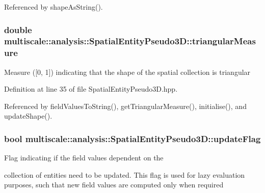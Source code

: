 Referenced by shape\-As\-String().

\hypertarget{classmultiscale_1_1analysis_1_1SpatialEntityPseudo3D_a7e8a7c888b5ab5a204f6d4ffa283709c}{
\subsubsection[{triangular\-Measure}]{\setlength{\rightskip}{0pt plus 5cm}double multiscale\-::analysis\-::\-Spatial\-Entity\-Pseudo3\-D\-::triangular\-Measure\hspace{0.3cm}{\ttfamily [protected]}}}\label{classmultiscale_1_1analysis_1_1SpatialEntityPseudo3D_a7e8a7c888b5ab5a204f6d4ffa283709c}
Measure (\mbox{[}0, 1\mbox{]}) indicating that the shape of the spatial collection is triangular 

Definition at line 35 of file Spatial\-Entity\-Pseudo3\-D.\-hpp.



Referenced by field\-Values\-To\-String(), get\-Triangular\-Measure(), initialise(), and update\-Shape().

\hypertarget{classmultiscale_1_1analysis_1_1SpatialEntityPseudo3D_a2fc7e2c00fcd725cb247b27c69726c8b}{
\subsubsection[{update\-Flag}]{\setlength{\rightskip}{0pt plus 5cm}bool multiscale\-::analysis\-::\-Spatial\-Entity\-Pseudo3\-D\-::update\-Flag\hspace{0.3cm}{\ttfamily [protected]}}}\label{classmultiscale_1_1analysis_1_1SpatialEntityPseudo3D_a2fc7e2c00fcd725cb247b27c69726c8b}
\begin{DoxyVerb}                Flag indicating if the field values dependent on the
\end{DoxyVerb}
 collection of entities need to be updated. This flag is used for lazy evaluation purposes, such that new field values are computed only when required 

